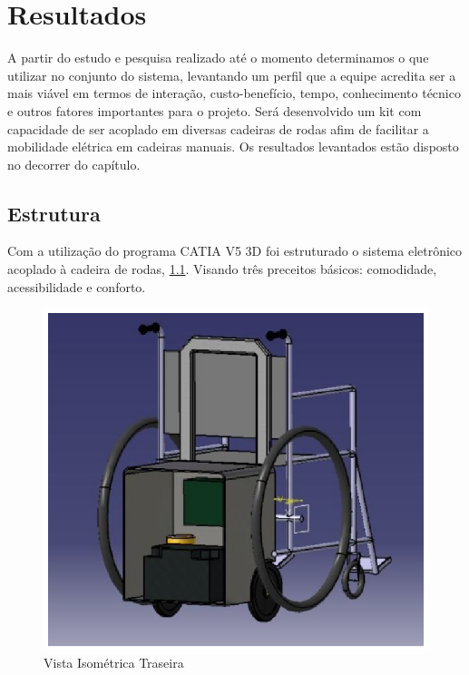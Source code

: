 \chapter[Resultados]{Resultados}

A partir do estudo e pesquisa realizado até o momento determinamos o que utilizar no conjunto do sistema, levantando um perfil que a equipe acredita ser a mais viável em termos de interação, custo-benefício, tempo, conhecimento técnico e outros fatores importantes para o projeto. Será desenvolvido um kit com capacidade de ser acoplado em diversas cadeiras de rodas afim de facilitar a mobilidade elétrica em cadeiras manuais. Os resultados levantados estão disposto no decorrer do capítulo.

\section{Estrutura}

Com a utilização do programa CATIA V5 3D foi estruturado o sistema eletrônico acoplado à cadeira de rodas, \ref{fig:vista_isometrica_traseira}. Visando três preceitos básicos: comodidade, acessibilidade e conforto.

\begin{figure}[!htb]
\centering
\includegraphics[keepaspectratio=true,scale=0.4]{figuras/estrutura/vista_isometrica_traseira}
\caption{Vista Isométrica Traseira}
\label{fig:vista_isometrica_traseira}
\end{figure}

